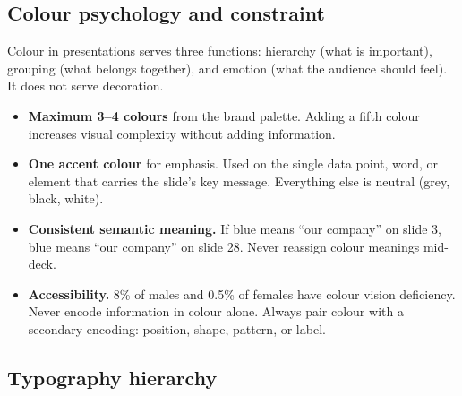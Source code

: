 
\subsection{Colour psychology and constraint}

Colour in presentations serves three functions: hierarchy (what is important), grouping (what belongs together), and emotion (what the audience should feel). It does not serve decoration.

\begin{keybox}
\begin{itemize}[leftmargin=1.2em]
  \item \textbf{Maximum 3--4 colours} from the brand palette. Adding a fifth colour increases visual complexity without adding information.
  \item \textbf{One accent colour} for emphasis. Used on the single data point, word, or element that carries the slide's key message. Everything else is neutral (grey, black, white).
  \item \textbf{Consistent semantic meaning.} If blue means ``our company'' on slide 3, blue means ``our company'' on slide 28. Never reassign colour meanings mid-deck.
  \item \textbf{Accessibility.} 8\% of males and 0.5\% of females have colour vision deficiency. Never encode information in colour alone. Always pair colour with a secondary encoding: position, shape, pattern, or label.
\end{itemize}
\end{keybox}


\subsection{Typography hierarchy}

